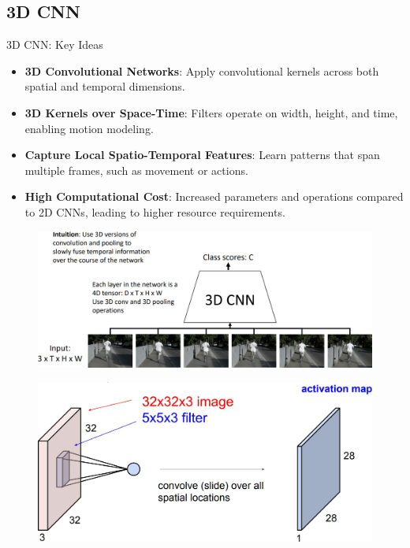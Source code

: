 \subsection{3D CNN}

\begin{frame}[allowframebreaks]{3D CNN: Key Ideas}
    \begin{itemize}
        \item \textbf{3D Convolutional Networks}: Apply convolutional kernels across both spatial and temporal dimensions.
        \item \textbf{3D Kernels over Space-Time}: Filters operate on width, height, and time, enabling motion modeling.
        \item \textbf{Capture Local Spatio-Temporal Features}: Learn patterns that span multiple frames, such as movement or actions.
        \item \textbf{High Computational Cost}: Increased parameters and operations compared to 2D CNNs, leading to higher resource requirements.
    \end{itemize}
\framebreak
    \begin{figure}
        \centering
        \includegraphics[width=1\textwidth,height=0.9\textheight,keepaspectratio]{images/video/slide_15_1_img.jpg}
    \end{figure}
\framebreak
    \begin{figure}
        \centering
        \includegraphics[width=1\textwidth,height=0.9\textheight,keepaspectratio]{images/video/slide_16_1_img.jpg}

\end{figure}
\end{frame}
